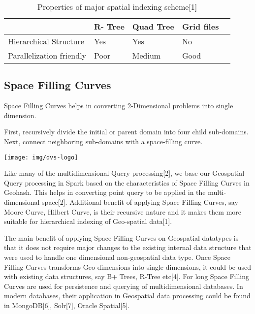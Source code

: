 \documentclass[article,type=msc,colorback,10pt,accentcolor=tud1d]{tudthesis}
\begin{document}
		   
		   \begin{table}[h]
		   	\centering
		   	\begin{tabular}[htbp]{llllc}
		   		\\	\hline 
			   	&\textbf{R- Tree} &\textbf{Quad Tree} &\textbf{Grid files}\\
			   	\hline
			   	Hierarchical Structure  &Yes   &Yes &No\\
			   	Parallelization friendly  &Poor  &Medium &Good \\
			   	
		   		\hline
		   	\end{tabular}
		   	\caption{Properties of major spatial indexing scheme[1]}
		   	\label{tab:Spatial indexing}
		   \end{table}
		   
		   
		   
		    
		   
		   
		   \subsection{Space Filling Curves}
		   
		   Space Filling Curves helps in converting 2-Dimensional problems into single dimension.
		   
		   First, recursively divide the initial or parent domain into four child sub-domains. Next, connect neighboring sub-domains with a space-filling curve.
		  
			  \texttt{[image: img/dvs-logo]}
		  
		  Like many of the multidimensional Query processing[2], we base our Geospatial Query processing in Spark based on the characteristics of Space Filling Curves in Geohash. This helps in converting point query to be applied in the multi-dimensional space[2]. Additional benefit of applying Space Filling Curves, say Moore Curve\cite{Moorecurve}, Hilbert Curve\cite{Hilbert}, is their recursive nature and it makes them more suitable for hierarchical indexing of Geo-spatial data[1]. 
		  
		  The main benefit of applying Space Filling Curves on Geospatial datatypes is that it does not require major changes to the existing internal data structure that were used to handle one dimensional non-geospatial data type. Once Space Filling Curves transforms Geo dimensions into single dimensions, it could be used with existing data structures, say B+ Trees, R-Tree etc[4]. For long Space Filling Curves are used for persistence and querying of multidimensional databases\cite{Lawder:2000:USC:646102.681186}. In modern databases, their application in Geospatial data processing could be found in MongoDB[6], Solr[7], Oracle Spatial[5]. 
		  
\end{document}
